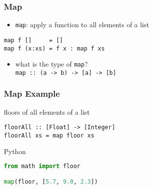 \documentclass[dvipsnames]{beamer}
\theoremstyle{plain}
\begin{document}
\begin{frame}[fragile]
  \frametitle{Map}

  \begin{itemize}
    \item \lstinline|map|: apply a function to all elements of a list
  \end{itemize}

  \begin{exampleblock}{}
    \begin{lstlisting}[deletekeywords={map}]
map f []     = []
map f (x:xs) = f x : map f xs
    \end{lstlisting}
  \end{exampleblock}

  \pause
  \begin{itemize}
    \item what is the type of \lstinline|map|?\\
      \lstinline|map :: (a -> b) -> [a] -> [b]|
  \end{itemize}
\end{frame}

\begin{frame}[fragile]
  \frametitle{Map Example}

  \begin{exampleblock}{floors of all elements of a list}
    \begin{lstlisting}
floorAll :: [Float] -> [Integer]
floorAll xs = map floor xs
    \end{lstlisting}
  \end{exampleblock}

  \bigskip
  \begin{exampleblock}{Python}
    \begin{lstlisting}[language=Python]
from math import floor

map(floor, [5.7, 9.0, 2.3])
    \end{lstlisting}
  \end{exampleblock}
\end{frame}
\end{document}
